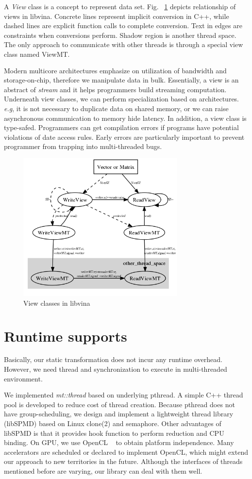 \documentclass[10pt, conference, compsocconf]{IEEEtran}
\begin{document}
A \emph{View} class is a concept to represent data set.
Fig. ~\ref{fig:view} depicts relationship of views in libvina. Concrete lines
represent implicit conversion in C++, while  dashed lines are explicit
function calls to complete conversion. Text in edges are constraints
when conversions perform. Shadow region is another thread space. The
only approach to communicate with other threads is through a special view
class named ViewMT.  

Modern multicore architectures emphasize on utilization of 
bandwidth and storage-on-chip, therefore we manipulate data in
bulk. Essentially, a view is an abstract of \emph{stream} and it
helps programmers build streaming computation. Underneath view
classes, we can perform specialization based on architectures. \textit{e.g}, it is not necessary to duplicate
data  on shared memory, or  we can raise asynchronous communication to memory
hide latency. In addition, a view class is type-safed. Programmers can get
compilation errors if programs have potential violations of date access rules. Early errors are particularly
important to prevent programmer from trapping into multi-threaded bugs.

\begin{figure}
\includegraphics[width=3.3in]{view_concept}
\caption{View classes in libvina}
\label{fig:view}
\end{figure}
\section{Runtime supports}
Basically, our static transformation does not incur any runtime
overhead. However, we need thread and synchronization to execute in
multi-threaded environment.

We implemented \emph{mt::thread} based on underlying pthread. A
simple C++ thread pool is developed to reduce cost of thread
creation. Because pthread does not have group-scheduling, we design
and implement a lightweight thread library (libSPMD) based on Linux
clone(2) and semaphore. Other advantages of libSPMD
is that it provides hook function to perform reduction and CPU binding. 
On GPU, we use OpenCL ~\cite{opencl} to obtain platform
independence. Many accelerators are scheduled or declared to
implement OpenCL, which might extend our approach to new
territories in the future.  Although the interfaces of threads
mentioned before are varying, our library can deal with them well.
\end{document}
